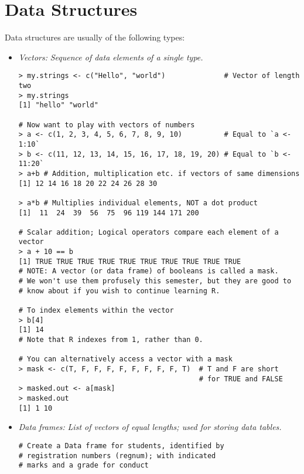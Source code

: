 \documentclass[12pt]{article}
\begin{document}

\section{Data Structures}
Data structures are usually of the following types:
\begin{itemize}

\item{\emph{Vectors:}} \emph{Sequence of data elements of a single type.}

\begin{verbatim}
> my.strings <- c("Hello", "world")              # Vector of length two
> my.strings
[1] "hello" "world"

# Now want to play with vectors of numbers
> a <- c(1, 2, 3, 4, 5, 6, 7, 8, 9, 10)          # Equal to `a <- 1:10`
> b <- c(11, 12, 13, 14, 15, 16, 17, 18, 19, 20) # Equal to `b <- 11:20`
> a+b # Addition, multiplication etc. if vectors of same dimensions
[1] 12 14 16 18 20 22 24 26 28 30

> a*b # Multiplies individual elements, NOT a dot product
[1]  11  24  39  56  75  96 119 144 171 200

# Scalar addition; Logical operators compare each element of a vector
> a + 10 == b
[1] TRUE TRUE TRUE TRUE TRUE TRUE TRUE TRUE TRUE TRUE
# NOTE: A vector (or data frame) of booleans is called a mask.
# We won't use them profusely this semester, but they are good to
# know about if you wish to continue learning R.

# To index elements within the vector
> b[4]
[1] 14
# Note that R indexes from 1, rather than 0.

# You can alternatively access a vector with a mask
> mask <- c(T, F, F, F, F, F, F, F, F, T)  # T and F are short
                                           # for TRUE and FALSE
> masked.out <- a[mask]
> masked.out
[1] 1 10

\end{verbatim}

\item{\emph{Data frames:}} \emph{List of vectors of equal lengths;
used for storing data tables.}
\begin{verbatim}
# Create a Data frame for students, identified by
# registration numbers (regnum); with indicated
# marks and a grade for conduct


\end{verbatim}
\end{itemize}
\end{document}
